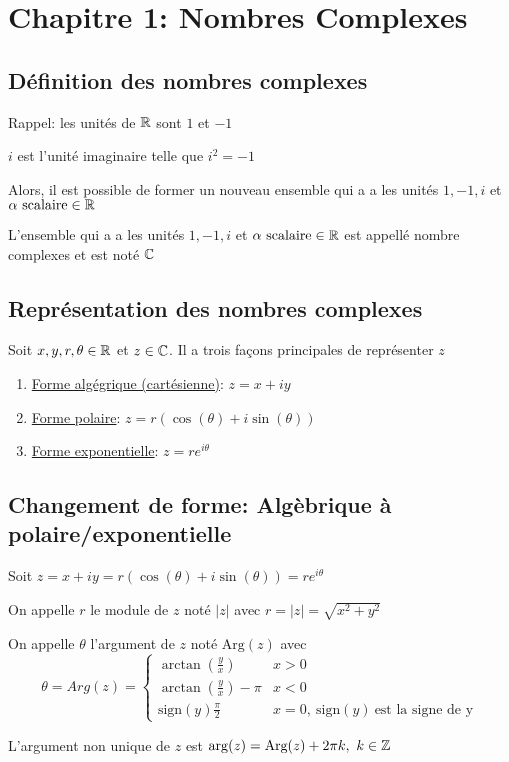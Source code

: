 \section{Chapitre 1: Nombres Complexes}

\subsection{Définition des nombres complexes}
Rappel: les unités de $\mathbb{R}$ sont $1$ et $-1$ 
\begin{definition}
    $i$ est l'unité imaginaire telle que $i^2 = -1$ 
\end{definition}
Alors, il est possible de former un nouveau ensemble qui a a les unités $1, -1, i$ et $\alpha \text{ scalaire} \in \mathbb{R}$
\begin{definition}
    L'ensemble qui a a les unités $1, -1, i$ et $\alpha \text{ scalaire} \in \mathbb{R}$ est appellé nombre complexes et est noté $\mathbb{C}$
\end{definition}

\subsection{Représentation des nombres complexes}
Soit $x, y, r, \theta \in \mathbb{R}$ et $z \in \mathbb{C}$. Il a trois façons principales de représenter $z$
\begin{enumerate}
    \item \underline{Forme algégrique (cartésienne)}: $z = x + iy$
    \item \underline{Forme polaire}: $z = r(\cos(\theta)+i\sin(\theta))$
    \item \underline{Forme exponentielle}: $z = re^{i\theta}$
\end{enumerate}

\subsection{Changement de forme: Algèbrique à polaire/exponentielle}
Soit $z = x + iy = r(\cos(\theta)+i\sin(\theta)) = re^{i\theta}$ 
\begin{definition}
    On appelle $r$ le module de $z$ noté $|z|$ avec $r = |z| = \sqrt{x^2 + y^2}$
\end{definition}
\begin{definition}
On appelle $\theta$ l'argument de $z$ noté $\text{Arg}(z)$ avec \[\theta = Arg(z) =
    \begin{cases}
        \arctan(\frac{y}{x})       & x > 0                            \\
        \arctan(\frac{y}{x}) - \pi & x < 0                            \\
        \text{sign}(y)\frac{\pi}{2}           & x = 0, \ \text{sign}(y) \ \text{est la signe de y}
    \end{cases}\]
\end{definition}
\begin{remark}
    L'argument non unique de $z$ est $\arg(z) = \text{Arg}(z) + 2\pi k, \ k \in \mathbb{Z}$
\end{remark}

